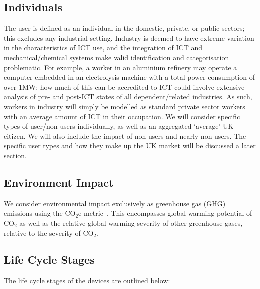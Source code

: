 \documentclass[conference]{IEEEtran}
\begin{document}
\subsection{Individuals}

The user is defined as an individual in the domestic, private, or
public sectors; this excludes any industrial setting. Industry is
deemed to have extreme variation in the characteristics of ICT use,
and the integration of ICT and mechanical/chemical systems make valid
identification and categorisation problematic. For example, a worker
in an aluminium refinery may operate a computer embedded in an
electrolysis machine with a total power consumption of over 1MW; how
much of this can be accredited to ICT could involve extensive analysis
of pre- and post-ICT states of all dependent/related industries. As
such, workers in industry will simply be modelled as standard private
sector workers with an average amount of ICT in their occupation.  We
will consider specific types of user/non-users individually, as well
as an aggregated `average' UK citizen. We will also include the impact
of non-users and nearly-non-users. The specific user types and how
they make up the UK market will be discussed a later section.

\subsection{Environment Impact}

We consider environmental impact exclusively as greenhouse gas (GHG) emissions using the CO$_2$e metric~\cite{bsi2050:2011,ieaco2em:2014}. This encompasses global warming potential of CO$_2$ as well as the relative global warming
severity of other greenhouse gases, relative to the severity of
CO$_2$. 


\subsection{Life Cycle Stages}

The life cycle stages of the devices are outlined below:
\end{document}
